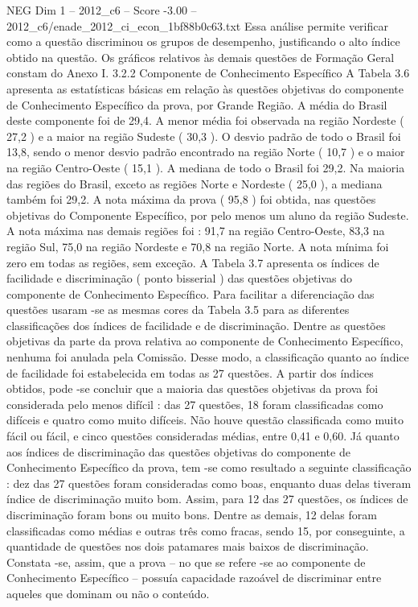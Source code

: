 \begin{textsample}{NEG Dim 1 – 2012\_c6 – Score -3.00 – 2012\_c6/enade\_2012\_ci\_econ\_1bf88b0c63.txt}
Essa análise permite verificar como a questão discriminou os grupos de desempenho, justificando o alto índice obtido na questão.
Os gráficos relativos às demais questões de Formação Geral constam do Anexo I. 3.2.2 Componente de Conhecimento Específico A Tabela 3.6 apresenta as estatísticas básicas em relação às questões objetivas do componente de Conhecimento Específico da prova, por Grande Região.
A média do Brasil deste componente foi de 29,4.
A menor média foi observada na região Nordeste ( 27,2 ) e a maior na região Sudeste ( 30,3 ).
O desvio padrão de todo o Brasil foi 13,8, sendo o menor desvio padrão encontrado na região Norte ( 10,7 ) e o maior na região Centro-Oeste ( 15,1 ).
A mediana de todo o Brasil foi 29,2.
Na maioria das regiões do Brasil, exceto as regiões Norte e Nordeste ( 25,0 ), a mediana também foi 29,2.
A nota máxima da prova ( 95,8 ) foi obtida, nas questões objetivas do Componente Específico, por pelo menos um aluno da região Sudeste.
A nota máxima nas demais regiões foi : 91,7 na região Centro-Oeste, 83,3 na região Sul, 75,0 na região Nordeste e 70,8 na região Norte.
A nota mínima foi zero em todas as regiões, sem exceção.
A Tabela 3.7 apresenta os índices de facilidade e discriminação ( ponto bisserial ) das questões objetivas do componente de Conhecimento Específico.
Para facilitar a diferenciação das questões usaram -se as mesmas cores da Tabela 3.5 para as diferentes classificações dos índices de facilidade e de discriminação.
Dentre as questões objetivas da parte da prova relativa ao componente de Conhecimento Específico, nenhuma foi anulada pela Comissão.
Desse modo, a classificação quanto ao índice de facilidade foi estabelecida em todas as 27 questões.
A partir dos índices obtidos, pode -se concluir que a maioria das questões objetivas da prova foi considerada pelo menos difícil : das 27 questões, 18 foram classificadas como difíceis e quatro como muito difíceis.
Não houve questão classificada como muito fácil ou fácil, e cinco questões consideradas médias, entre 0,41 e 0,60.
Já quanto aos índices de discriminação das questões objetivas do componente de Conhecimento Específico da prova, tem -se como resultado a seguinte classificação : dez das 27 questões foram consideradas como boas, enquanto duas delas tiveram índice de discriminação muito bom.
Assim, para 12 das 27 questões, os índices de discriminação foram bons ou muito bons.
Dentre as demais, 12 delas foram classificadas como médias e outras três como fracas, sendo 15, por conseguinte, a quantidade de questões nos dois patamares mais baixos de discriminação.
Constata -se, assim, que a prova – no que se refere -se ao componente de Conhecimento Específico – possuía capacidade razoável de discriminar entre aqueles que dominam ou não o conteúdo.

\end{textsample}
